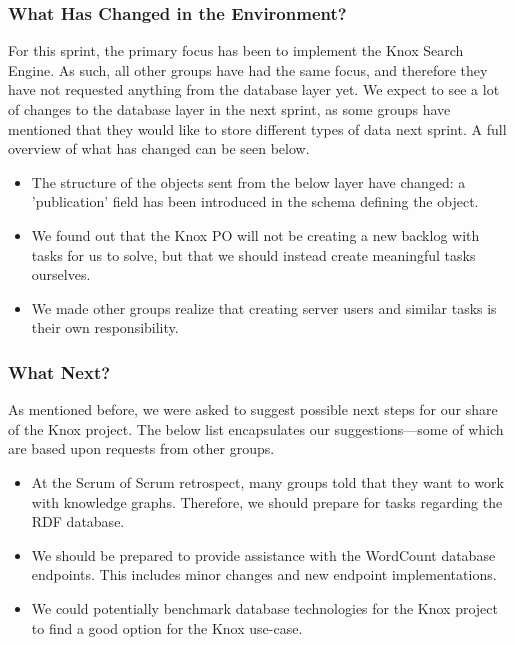 \subsubsection{What Has Changed in the Environment?}
For this sprint, the primary focus has been to implement the Knox Search Engine. As such, all other groups have had the same focus, and therefore they have not requested anything from the database layer yet. 
We expect to see a lot of changes to the database layer in the next sprint, as some groups have mentioned that they would like to store different types of data next sprint.
A full overview of what has changed can be seen below.

\begin{itemize}
    \item The structure of the objects sent from the below layer have changed: a 'publication' field has been introduced in the schema defining the object.
    \item We found out that the Knox PO will not be creating a new backlog with tasks for us to solve, but that we should instead create meaningful tasks ourselves.
    \item We made other groups realize that creating server users and similar tasks is their own responsibility.
\end{itemize}

\subsubsection{What Next?}
As mentioned before, we were asked to suggest possible next steps for our share of the Knox project. The below list encapsulates our suggestions---some of which are based upon requests from other groups.

\begin{itemize}
    \item At the Scrum of Scrum retrospect, many groups told that they want to work with knowledge graphs. Therefore, we should prepare for tasks regarding the RDF database.
    \item We should be prepared to provide assistance with the WordCount database endpoints. This includes minor changes and new endpoint implementations.
    \item We could potentially benchmark database technologies for the Knox project to find a good option for the Knox use-case.
\end{itemize}